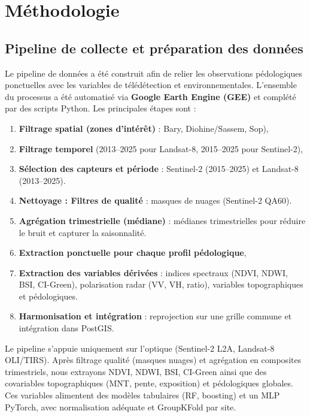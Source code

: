 \documentclass[12pt,a4paper,oneside]{report}
\begin{document}
\chapter{Méthodologie}

\section{Pipeline de collecte et préparation des données}
Le pipeline de données a été construit afin de relier les observations pédologiques ponctuelles avec les variables de télédétection et environnementales. L’ensemble du processus a été automatisé via \textbf{Google Earth Engine (GEE)} et complété par des scripts Python. Les principales étapes sont :
\begin{enumerate}
\item \textbf{Filtrage spatial (zones d’intérêt) }: Bary, Diohine/Sassem, Sop),
\item \textbf{Filtrage temporel} (2013–2025 pour Landsat-8, 2015–2025 pour Sentinel-2),
\item \textbf{Sélection des capteurs et période} : Sentinel-2 (2015–2025) et Landsat-8 (2013–2025).
\item \textbf{Nettoyage : Filtres de qualité} : masques de nuages (Sentinel-2 QA60).
\item \textbf{Agrégation trimestrielle (médiane)} : médianes trimestrielles pour réduire le bruit et capturer la saisonnalité.

\item \textbf{Extraction ponctuelle pour chaque profil pédologique},
\item \textbf{Extraction des variables dérivées} : indices spectraux (NDVI, NDWI, BSI, CI-Green), polarisation radar (VV, VH, ratio), variables topographiques et pédologiques.
\item \textbf{Harmonisation et intégration} : reprojection sur une grille commune et intégration dans PostGIS.


\end{enumerate}

Le pipeline s’appuie uniquement sur l’optique (Sentinel-2 L2A, Landsat-8 OLI/TIRS). Après filtrage qualité (masques nuages) et agrégation en composites trimestriels, nous extrayons NDVI, NDWI, BSI, CI-Green ainsi que des covariables topographiques (MNT, pente, exposition) et pédologiques globales. Ces variables alimentent des modèles tabulaires (RF, boosting) et un MLP PyTorch, avec normalisation adéquate et GroupKFold par site. 
\end{document}
